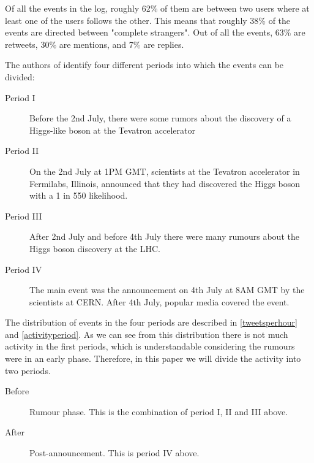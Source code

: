 \documentclass[sigconf]{acmart}
\begin{document}
Of all the events in the log, roughly 62\% of them are between two users where at least one of the users follows the other. This means that roughly 38\% of the events are directed between "complete strangers". Out of all the events, 63\% are retweets, 30\% are mentions, and 7\% are replies. 

The authors of \cite{de2013anatomy} identify four different periods into which the events can be divided:

\begin{description}
\item[Period I] Before the 2nd July, there were some rumors about the discovery of a Higgs-like boson at the Tevatron accelerator
\item[Period II] On the 2nd July at 1PM GMT, scientists at the Tevatron accelerator in Fermilabs, Illinois, announced that they had discovered the Higgs boson with a 1 in 550 likelihood. 
\item[Period III] After 2nd July and before 4th July there were many rumours about the Higgs boson discovery at the LHC. 
\item[Period IV] The main event was the announcement on 4th July at 8AM GMT by the scientists at CERN. After 4th July, popular media covered the event. 
\end{description}

The distribution of events in the four periods are described in \autoref{tweetsperhour} and \autoref{activityperiod}. As we can see from this distribution there is not much activity in the first periods, which is understandable considering the rumours were in an early phase. Therefore, in this paper we will divide the activity into two periods.

\begin{description}
\item[Before] Rumour phase. This is the combination of period I, II and III above.
\item[After] Post-announcement. This is period IV above.
\end{description}
\end{document}
